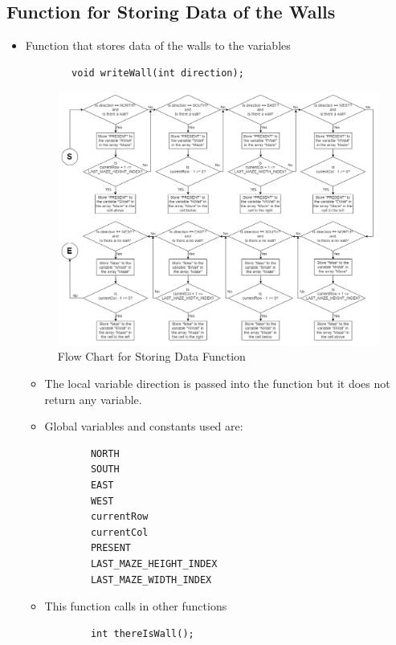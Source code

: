 \documentclass[11pt]{article}
\begin{document}
\subsection{Function for Storing Data of the Walls}
\begin{itemize}
\item Function that stores data of the walls to the variables
	\begin{verbatim}
		void writeWall(int direction);
	\end{verbatim}
\begin{figure}[htp]
\centering
\includegraphics[scale=0.41]{images/Software_Flowchart/writeWall.png}
\caption{Flow Chart for Storing Data Function}
\label{}
\end{figure}
	\begin{itemize}
	\item The local variable direction is passed into the function but it does not return any variable.
	\item Global variables and constants used are:
	\begin{verbatim}
		NORTH
		SOUTH
		EAST
		WEST
		currentRow
		currentCol
		PRESENT
		LAST_MAZE_HEIGHT_INDEX
		LAST_MAZE_WIDTH_INDEX
	\end{verbatim}
	\item This function calls in other functions 
	\begin{verbatim}
		int thereIsWall();
	\end{verbatim}
	\end{itemize}
\end{itemize}
\newpage
\end{document}
